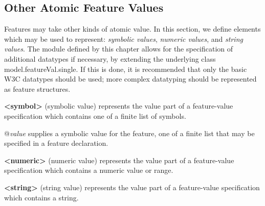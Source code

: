 \subsection[{Other Atomic Feature Values}]{Other Atomic Feature Values}\label{FSSY}\par
Features may take other kinds of atomic value. In this section, we define elements which may be used to represent: \textit{symbolic values}, \textit{numeric values}, and \textit{string values}. The module defined by this chapter allows for the specification of additional datatypes if necessary, by extending the underlying class \textsf{model.featureVal.single}. If this is done, it is recommended that only the basic W3C datatypes should be used; more complex datatyping should be represented as feature structures. 
\begin{sansreflist}
  
\item [\textbf{<symbol>}] (symbolic value) represents the value part of a feature-value specification which contains one of a finite list of symbols.\hfil\\[-10pt]\begin{sansreflist}
    \item[@{\itshape value}]
  supplies a symbolic value for the feature, one of a finite list that may be specified in a feature declaration.
\end{sansreflist}  
\item [\textbf{<numeric>}] (numeric value) represents the value part of a feature-value specification which contains a numeric value or range.
\item [\textbf{<string>}] (string value) represents the value part of a feature-value specification which contains a string.
\end{sansreflist}
\par
